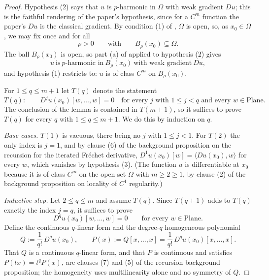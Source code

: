 \begin{proof}
Hypothesis (2) says that $u$ is $p$-harmonic in $\Omega$ with weak gradient $Du$; this is the
faithful rendering of the paper's hypothesis, since for a $C^{m}$ function the paper's $Du$ is
the classical gradient.  By condition (1) of , $\Omega$ is open, so, as
$x_0\in\Omega$, we may fix once and for all
\[
  \rho>0\qquad\text{with}\qquad B_\rho(x_0)\subseteq\Omega .
\]
The ball $B_\rho(x_0)$ is open, so part (a) of  applied to hypothesis (2)
gives
\begin{equation}\label{eq:rig-ball}
  u\ \text{is}\ p\text{-harmonic in}\ B_\rho(x_0)\ \text{with weak gradient}\ Du ,
\end{equation}
and hypothesis (1) restricts to: $u$ is of class $C^{m}$ on $B_\rho(x_0)$.

For $1\le q\le m+1$ let $T(q)$ denote the statement
\[
  T(q):\qquad D^{j}u(x_0)[w,\ldots,w]=0\quad\text{for every }j\text{ with }1\le j<q
  \text{ and every }w\in\mathrm{Plane}.
\]
The conclusion of the lemma is contained in $T(m+1)$, so it suffices to prove $T(q)$ for every
$q$ with $1\le q\le m+1$.  We do this by induction on $q$.

\medskip\noindent\emph{Base cases.}
$T(1)$ is vacuous, there being no $j$ with $1\le j<1$.  For $T(2)$ the only index is $j=1$, and
by clause (6) of the background proposition on the recursion for the iterated Fr\'echet
derivative, $D^{1}u(x_0)[w]=\langle Du(x_0),w\rangle$ for every $w$, which vanishes by
hypothesis (3).  (The function $u$ is differentiable at $x_0$ because it is of class $C^{m}$ on
the open set $\Omega$ with $m\ge2\ge1$, by clause (2) of the background proposition on locality
of $C^{1}$ regularity.)

\medskip\noindent\emph{Inductive step.}
Let $2\le q\le m$ and assume $T(q)$.  Since $T(q+1)$ adds to $T(q)$ exactly the index $j=q$, it
suffices to prove
\begin{equation}\label{eq:rig-goal}
  D^{q}u(x_0)[w,\ldots,w]=0\qquad\text{for every }w\in\mathrm{Plane}.
\end{equation}
Define the continuous $q$-linear form and the degree-$q$ homogeneous polynomial
\[
  Q:=\frac{1}{q!}\,D^{q}u(x_0),\qquad P(x):=Q[x,\ldots,x]=\frac{1}{q!}\,D^{q}u(x_0)[x,\ldots,x].
\]
That $Q$ is a continuous $q$-linear form, and that $P$ is continuous and satisfies
$P(tx)=t^{q}P(x)$, are clauses (7) and (5) of the recursion background proposition; the
homogeneity uses multilinearity alone and no symmetry of $Q$.


\end{proof}
